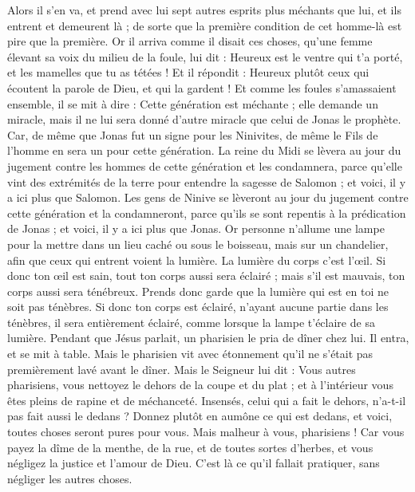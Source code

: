 \begin{multicols}{2}
Alors il s'en va, et prend avec lui sept autres esprits plus méchants que lui, et ils entrent et demeurent là ; de sorte que la première condition de cet homme-là est pire que la première.
Or il arriva comme il disait ces choses, qu'une femme élevant sa voix du milieu de la foule, lui dit : Heureux est le ventre qui t'a porté, et les mamelles que tu as tétées !
Et il répondit : Heureux plutôt ceux qui écoutent la parole de Dieu, et qui la gardent !
Et comme les foules s'amassaient ensemble, il se mit à dire : Cette génération est méchante ; elle demande un miracle, mais il ne lui sera donné d’autre miracle que celui de Jonas le prophète.
Car, de même que Jonas fut un signe pour les Ninivites, de même le Fils de l'homme en sera un pour cette génération.
La reine du Midi se lèvera au jour du jugement contre les hommes de cette génération et les condamnera, parce qu'elle vint des extrémités de la terre pour entendre la sagesse de Salomon ; et voici, il y a ici plus que Salomon.
Les gens de Ninive se lèveront au jour du jugement contre cette génération et la condamneront, parce qu'ils se sont repentis à la prédication de Jonas ; et voici, il y a ici plus que Jonas.
Or personne n’allume une lampe pour la mettre dans un lieu caché ou sous le boisseau, mais sur un chandelier, afin que ceux qui entrent voient la lumière.
La lumière du corps c'est l’œil. Si donc ton œil est sain, tout ton corps aussi sera éclairé ; mais s'il est mauvais, ton corps aussi sera ténébreux.
Prends donc garde que la lumière qui est en toi ne soit pas ténèbres.
Si donc ton corps est éclairé, n'ayant aucune partie dans les ténèbres, il sera entièrement éclairé, comme lorsque la lampe t'éclaire de sa lumière.
Pendant que Jésus parlait, un pharisien le pria de dîner chez lui. Il entra, et se mit à table.
Mais le pharisien vit avec étonnement qu'il ne s'était pas premièrement lavé avant le dîner.
Mais le Seigneur lui dit : Vous autres pharisiens, vous nettoyez le dehors de la coupe et du plat ; et à l’intérieur vous êtes pleins de rapine et de méchanceté.
Insensés, celui qui a fait le dehors, n'a-t-il pas fait aussi le dedans ?
Donnez plutôt en aumône ce qui est dedans, et voici, toutes choses seront pures pour vous.
Mais malheur à vous, pharisiens ! Car vous payez la dîme de la menthe, de la rue, et de toutes sortes d’herbes, et vous négligez la justice et l'amour de Dieu. C’est là ce qu’il fallait pratiquer, sans négliger les autres choses.

\end{multicols}
